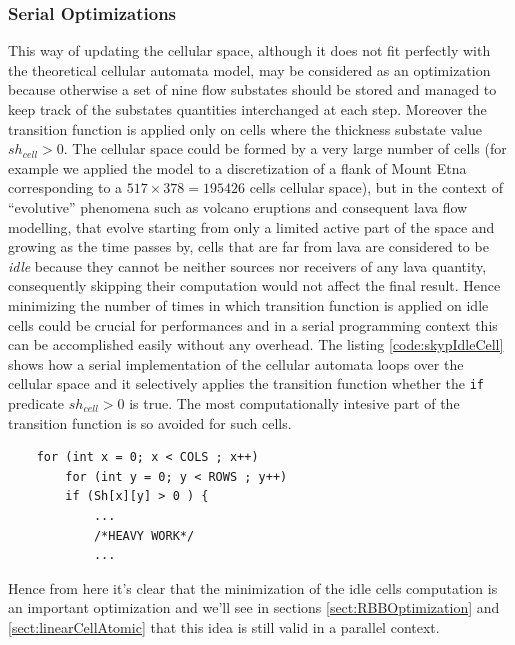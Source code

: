 \subsubsection{Serial Optimizations}\label{sect:serialoptimization}
This way of updating the cellular space, although it does not fit perfectly with
the theoretical cellular automata model, may be considered as an optimization
because otherwise a set of nine flow substates should be stored and managed to
keep track of the substates quantities interchanged at each step.
Moreover the transition function is applied only on cells where the thickness
substate value \(sh_{cell} > 0 \). The cellular space could be formed by a very
large number of cells (for example we applied the model to a discretization of a
flank of Mount Etna corresponding to a \(517 \times 378 = 195426\) cells
cellular space), but in the context of ``evolutive'' phenomena such as volcano
eruptions and consequent lava flow modelling, that evolve starting from only a
limited active part of the space and growing as the time passes by, cells that
are far from lava are considered to be \textit{idle} because they cannot be
neither sources nor receivers of any lava quantity, consequently skipping their
computation would not affect the final result. Hence minimizing the number of
times in which transition function is applied on idle cells could be crucial for
performances and in a serial programming context this can be accomplished easily
without any overhead.
The listing \ref{code:skypIdleCell} shows how a serial implementation of the
cellular automata loops over the cellular space and it selectively applies the
transition function whether the \texttt{if} predicate \(sh_{cell} > 0 \) is
true.
The most computationally intesive part of the transition function is so avoided
for such cells.
\begin{lstlisting}
	for (int x = 0; x < COLS ; x++)
		for (int y = 0; y < ROWS ; y++)
		if (Sh[x][y] > 0 ) {
			...
			/*HEAVY WORK*/
			...
\end{lstlisting}


Hence from here it's clear that the minimization of the idle cells computation
is an important optimization and we'll see in sections \ref{sect:RBBOptimization} and
\ref{sect:linearCellAtomic} that this idea is still valid in a parallel context.

